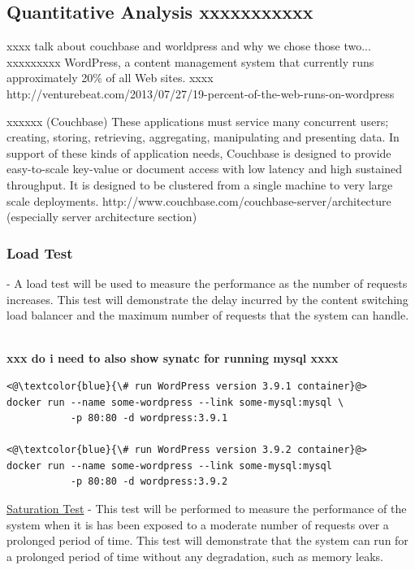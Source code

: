 \documentclass[a4paper,11pt,twoside]{article}
\begin{document}
\subsection{Quantitative Analysis xxxxxxxxxxx}\label{Quantitative_Analysis}
xxxx talk about couchbase and worldpress and why we chose those two...\bigskip
xxxxxxxxx WordPress, a content management system that currently runs approximately 20\% of all Web sites.
xxxx   http://venturebeat.com/2013/07/27/19-percent-of-the-web-runs-on-wordpress\bigskip  

\noindent
xxxxxx (Couchbase) These applications must service many concurrent users; creating, storing, retrieving, aggregating, manipulating and presenting data. In support of these kinds of application needs, Couchbase is designed to provide easy-to-scale key-value or document access with low latency and high sustained throughput. It is designed to be clustered from a single machine to very large scale deployments. http://www.couchbase.com/couchbase-server/architecture (especially server architecture section) \bigskip


\subsubsection{Load Test}\label{load} - A load test will be used to measure the performance as the number of requests increases. This test will demonstrate the delay incurred by the content switching load balancer and the maximum number of requests that the system can handle.

\noindent\\
\textbf{xxx do i need to also show synatc for running mysql xxxx}
\begin{lstlisting}[language=terminal]
<@\textcolor{blue}{\# run WordPress version 3.9.1 container}@>
docker run --name some-wordpress --link some-mysql:mysql \
           -p 80:80 -d wordpress:3.9.1

<@\textcolor{blue}{\# run WordPress version 3.9.2 container}@>
docker run --name some-wordpress --link some-mysql:mysql 
           -p 80:80 -d wordpress:3.9.2
\end{lstlisting}




\noindent
\underline{Saturation Test} - This test will be performed to measure the performance of the system when it is has been exposed to a moderate number of requests over a prolonged period of time. This test will demonstrate that the system can run for a prolonged period of time without any degradation, such as memory leaks.
\end{document}
